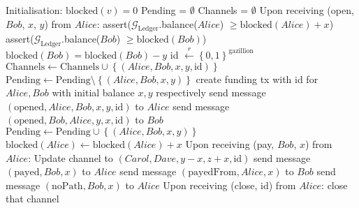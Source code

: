 \begin{algorithm}
  \caption{$\mathcal{F}_{\mathrm{PayNet}}$}
  \label{alg:payfunc}
  \begin{algorithmic}[1]
    \State Initialisation:
      \Indent
        \State $\mathrm{blocked}\left(v\right) = 0$
      \EndFor
      \State Pending = $\emptyset$
      \State Channels = $\emptyset$
      \EndIndent
    \State
    \State Upon receiving (open, $Bob$, $x$, $y$) from $Alice$:
        \State assert($\mathcal{G}_{\mathrm{Ledger}}$.balance($Alice$) $\geq
        \mathrm{blocked}\left(Alice\right) + x$)
        \State assert($\mathcal{G}_{\mathrm{Ledger}}$.balance($Bob$) $\geq
        \mathrm{blocked}\left(Bob\right)$)
        \State $\mathrm{blocked}\left(Bob\right) = \mathrm{blocked}\left(Bob\right) - y$
        \State id $\overset{r}{\leftarrow} \left\{0, 1\right\}^{\mathrm{gazillion}}$
        \State $\mathrm{Channels} \leftarrow \mathrm{Channels} \cup \left\{\left(Alice,
        Bob, x, y, \mathrm{id}\right)\right\}$
        \State $\mathrm{Pending} \leftarrow \mathrm{Pending} \setminus \left\{\left(Alice,
        Bob, x, y\right)\right\}$
        \State create funding tx with id for $Alice, Bob$ with initial balance $x, y$
        respectively
        \State send message $\left(\mathrm{opened}, Alice, Bob, x, y, \mathrm{id}\right)$
        to $Alice$
        \State send message $\left(\mathrm{opened}, Bob, Alice, y, x, \mathrm{id}\right)$
        to $Bob$
      \Else
        \State $\mathrm{Pending} \leftarrow \mathrm{Pending} \cup \left\{\left(Alice, Bob,
        x, y\right)\right\}$
        \State $\mathrm{blocked}\left(Alice\right) \leftarrow
        \mathrm{blocked}\left(Alice\right) + x$
      \EndIf
    \State
    \State Upon receiving (pay, $Bob$, $x$) from $Alice$:
          \State Update channel to $\left(Carol, Dave, y - x, z + x, \mathrm{id}\right)$
        \EndFor
        \State send message $\left(\mathrm{payed}, Bob, x\right)$ to $Alice$
        \State send message $\left(\mathrm{payedFrom}, Alice, x\right)$ to $Bob$
      \Else
        \State send message $\left(\mathrm{noPath}, Bob, x\right)$ to $Alice$
      \EndIf
    \State
    \State Upon receiving (close, id) from $Alice$:
        \State close that channel
      \EndIf
  \end{algorithmic}
\end{algorithm}
